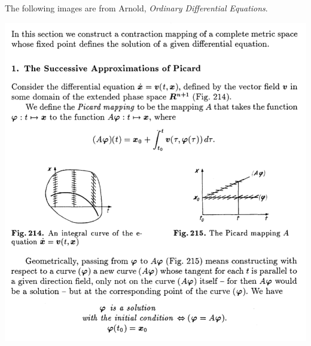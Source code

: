 The following images are from Arnold, \textit{Ordinary Differential Equations}.\\

\begin{mdframed}
\includegraphics[width=400pt]{img/differential-equations-picard-contraction-mapping-fixed-point-arnold.png}
\end{mdframed}

